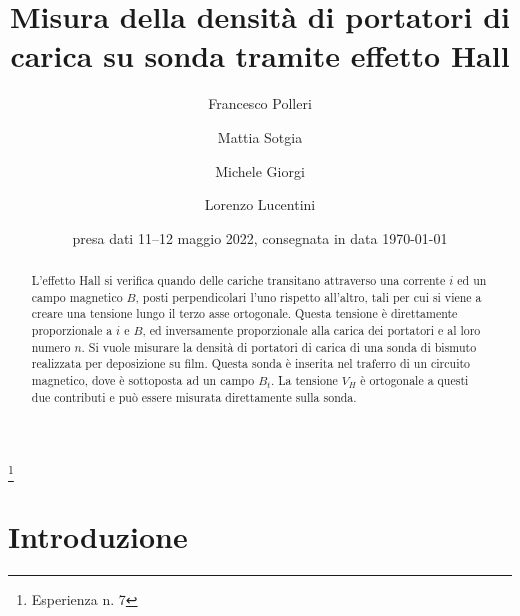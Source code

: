 \documentclass[
    prl,
    reprint, 
    superscriptaddress, 
    altaffilletter, 
    amsmath, 
    amssymb, 
    a4paper,
    varvw]{revtex4-2}
\begin{document}
\title{Misura della densità di portatori di carica su sonda tramite effetto Hall
}
\thanks{Esperienza n. 7
}

\author{Francesco Polleri}
\author{Mattia Sotgia}

\author{Michele Giorgi}
\author{Lorenzo Lucentini}


\date{presa dati
    11--12 maggio 2022, consegnata in data 
    \today
}

\begin{abstract}
    L'effetto Hall si verifica quando delle cariche transitano attraverso una corrente $i$ ed un campo magnetico $B$, posti perpendicolari l'uno rispetto all'altro, tali per cui si viene a creare una tensione lungo il terzo asse ortogonale. Questa tensione è direttamente proporzionale a $i$ e $B$, ed inversamente proporzionale alla carica dei portatori e al loro numero $n$.
    Si vuole misurare la densità di portatori di carica di una sonda di bismuto  realizzata per deposizione su film. Questa sonda è inserita nel traferro di un circuito magnetico, dove è sottoposta ad un campo $B_t$. La tensione $V_H$ è ortogonale a questi due contributi e può essere misurata direttamente sulla sonda.
\end{abstract}


\maketitle
\thispagestyle{fancy}


\section{Introduzione}
\end{document}

